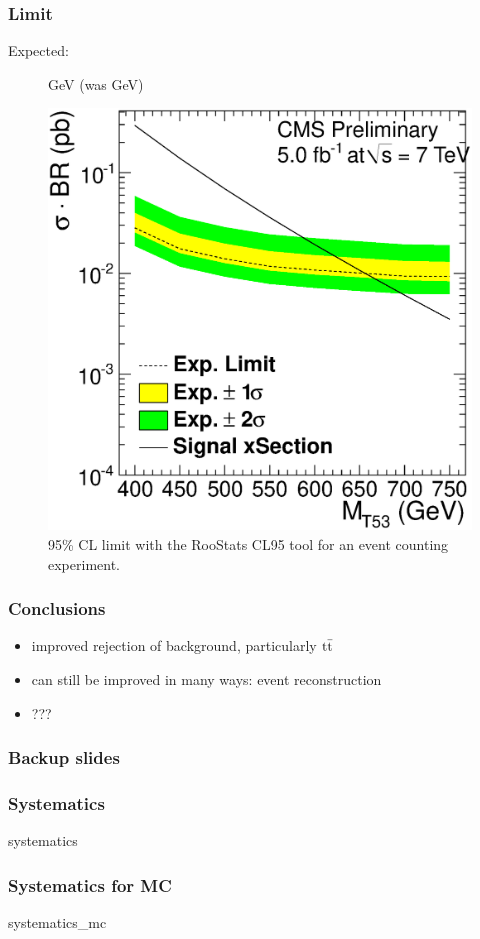 \documentclass[ukenglish]{beamer}
\begin{document}
\begin{frame}
    \frametitle{Limit}
    \begin{description}
        \item[Expected:] \unit[658]{GeV} (was \unit[645]{GeV})
    \end{description}
    \begin{figure}[h]
        \centering
    \includegraphics[height=.6\textheight]{oLimit_limit_macro_4jets_opt_btag_200_350_02.eps}
        \caption{95\% CL limit with the RooStats CL95 tool for an event
        counting experiment.}
    \end{figure}
\end{frame}

\begin{frame}
    \frametitle{Conclusions}
    \begin{itemize}
        \item improved rejection of background, particularly $\mathrm{t}\bar{\mathrm{t}}$
        \item can still be improved in many ways: event reconstruction
        \item ???
    \end{itemize}
\end{frame}

\begin{frame}
    \frametitle{Backup slides}
\end{frame}

\begin{frame}
    \frametitle{Systematics}
    {systematics}
\end{frame}

\begin{frame}
    \frametitle{Systematics for MC}
    {systematics_mc}
\end{frame}
\end{document}
